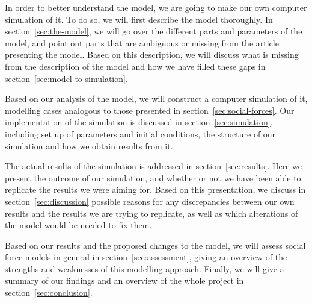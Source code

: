 In order to better understand the model, we are going to make our own computer
simulation of it. To do so, we will first describe the model thoroughly. In
section~\ref{sec:the-model}, we will go over the different parts and
parameters of the model, and point out parts that are ambiguous or missing
from the article presenting the model. Based on this description, we will
discuss what is missing from the description of the model and how we have
filled these gaps in section~\ref{sec:model-to-simulation}.

Based on our analysis of the model, we will construct a computer simulation of
it, modelling cases analogous to those presented in
section~\ref{sec:social-forces}. Our implementation of the simulation is discussed in section~\ref{sec:simulation}, including set up of
parameters and initial conditions, the structure of our simulation and how we
obtain results from it.

The actual results of the simulation is addressed in
section~\ref{sec:results}. Here we present the outcome of our simulation, and
whether or not we have been able to replicate the results we were aiming for.
Based on this presentation, we discuss in section~\ref{sec:discussion}
possible reasons for any discrepancies between our own results and the results
we are trying to replicate, as well as which alterations of the model would
be needed to fix them.

Based on our results and the proposed changes to the model, we will assess
social force models in general in section~\ref{sec:assessment}, giving an
overview of the strengths and weaknesses of this modelling approach. Finally,
we will give a summary of our findings and an overview of the whole project in
section~\ref{sec:conclusion}.
